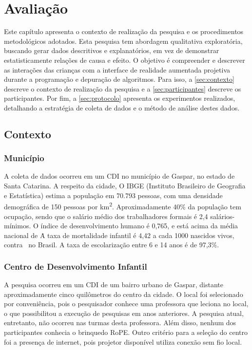 \chapter{Avaliação}
\label{c_avaliacao}
Este capítulo apresenta o contexto de realização da pesquisa e os procedimentos metodológicos adotados. Esta pesquisa tem abordagem qualitativa exploratória, buscando gerar dados descritivos e explanatórios, em vez de demonstrar estatisticamente relações de causa e efeito. O objetivo é compreender e descrever as interações das crianças com a interface de realidade aumentada projetiva durante a programação e depuração de algoritmos. Para isso, a \autoref{sec:contexto} descreve o contexto de realização da pesquisa e a \autoref{sec:participantes} descreve os participantes. Por fim, a \autoref{sec:protocolo} apresenta os experimentos realizados, detalhando a estratégia de coleta de dados e o método de análise destes dados.

\section{Contexto}
\label{sec:contexto}
\subsection{Município}
A coleta de dados ocorreu em um \ac{CDI} no município de Gaspar, no estado de Santa Catarina. A respeito da cidade, O IBGE (Instituto Brasileiro de Geografia e Estatística) estima a população em 70.793 pessoas, com uma densidade demográfica de 150 pessoas por km\textsuperscript{2}. Aproximadamente 40\% da população tem ocupação, sendo que o salário médio dos trabalhadores formais é 2,4 salários-mínimos. O índice de desenvolvimento humano é 0,765, e está acima da média nacional de \. A taxa de mortalidade infantil é 4,42 a cada 1000 nascidos vivos, contra \ no Brasil. A taxa de escolarização entre 6 e 14 anos é de 97,3\%.
\subsection{Centro de Desenvolvimento Infantil}
\label{sec:cdi}
A pesquisa ocorreu em um  \ac{CDI} de um bairro urbano de Gaspar, distante aproximadamente cinco quilômetros do centro da cidade. O local foi selecionado por conveniência, pois o pesquisador conhece uma professora que leciona no local, o que possibilitou a execução de pesquisas em anos anteriores. A pesquisa atual, entretanto, não ocorreu nas turmas desta professora. Além disso, nenhum dos participantes conhecia o brinquedo RoPE. Outro critério para a seleção do centro foi a presença de internet, pois projetor disponível utiliza conexão sem fio local.

